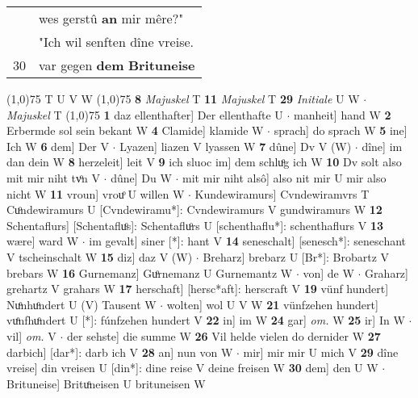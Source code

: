 \documentclass[8pt,a4paper,notitlepage]{article}
\begin{document}
\begin{table}[ht]
\begin{minipage}[t]{0.5\linewidth}
\begin{tabular}{rl}
 & wes gerstû \textbf{an} mir mêre?"\\ 
 & "Ich wil senften dîne vreise.\\ 
30 & var gegen \textbf{dem} \textbf{Brituneise}\\ 
\end{tabular}
\scriptsize
\line(1,0){75} \newline
T U V W \newline
\line(1,0){75} \newline
\textbf{8} \textit{Majuskel} T  \textbf{11} \textit{Majuskel} T  \textbf{29} \textit{Initiale} U W   $\cdot$ \textit{Majuskel} T  \newline
\line(1,0){75} \newline
\textbf{1} daz ellenthafter] Der ellenthafte U  $\cdot$ manheit] hand W \textbf{2} Erbermde sol sein bekant W \textbf{4} Clamide] klamide W  $\cdot$ sprach] do sprach W \textbf{5} ine] Ich W \textbf{6} dem] Der V  $\cdot$ Lyazen] liazen V lyassen W \textbf{7} dûne] Dv V (W)  $\cdot$ dîne] im dan dein W \textbf{8} herzeleit] leit V \textbf{9} ich sluoc im] dem schluͦg ich W \textbf{10} Dv solt also mit mir niht tvͦn V  $\cdot$ dûne] Du W  $\cdot$ mit mir niht alsô] also nit mir U mir also nicht W \textbf{11} vroun] vrouͦ U willen W  $\cdot$ Kundewiramurs] Cvndewiramvrs T Cuͦndewiramurs U [Cvndewiramu*]: Cvndewiramurs V gundwiramurs W \textbf{12} Schentaflurs] [Schentafluͦs]: Schentafluͦrs U [schenthaflu*]: schenthaflurs V \textbf{13} wære] ward W  $\cdot$ im gevalt] siner [*]: hant V \textbf{14} seneschalt] [senesch*]: seneschant V tscheinschalt W \textbf{15} diz] daz V (W)  $\cdot$ Breharz] brebarz U [Br*]: Brobartz V brebars W \textbf{16} Gurnemanz] Guͦrnemanz U Gurnemantz W  $\cdot$ von] de W  $\cdot$ Graharz] grehartz V grahars W \textbf{17} herschaft] [hersc*aft]: herscraft V \textbf{19} vünf hundert] Nuͦnhuͦndert U (V) Tausent W  $\cdot$ wolten] wol U V W \textbf{21} vünfzehen hundert] vuͦnfhuͦndert U [*]: fúnfzehen hundert V \textbf{22} in] im W \textbf{24} gar] \textit{om.} W \textbf{25} ir] In W  $\cdot$ vil] \textit{om.} V  $\cdot$ der sehste] die summe W \textbf{26} Vil helde vielen do dernider W \textbf{27} darbich] [dar*]: darb ich V \textbf{28} an] nun von W  $\cdot$ mir] mir mir U mich V \textbf{29} dîne vreise] din vreisen U [din*]: dine reise V deine freisen W \textbf{30} dem] den U W  $\cdot$ Brituneise] Brituͦneisen U brituneisen W \newline
\end{minipage}
\end{table}
\end{document}
